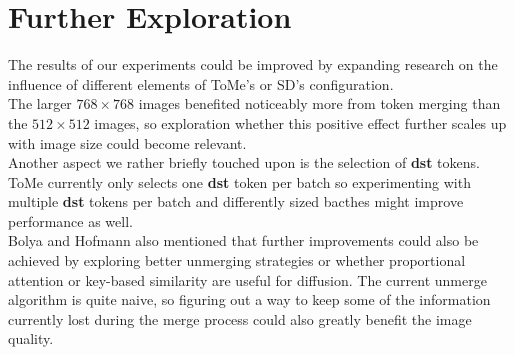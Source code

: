 \section{Further Exploration}
The results of our experiments could be improved by expanding research on the influence of different elements of ToMe's or SD's configuration.\\ 
The larger $768 \times 768$ images benefited noticeably more from token merging than the $512 \times 512$ images, so exploration whether this positive effect further scales up with image size could become relevant.\\
Another aspect we rather briefly touched upon is the selection of \textbf{dst} tokens. ToMe currently only selects one \textbf{dst} token per batch so experimenting with multiple \textbf{dst} tokens per batch and differently sized bacthes might improve performance as well.\\ 
Bolya and Hofmann also mentioned that further improvements could also be achieved by exploring better unmerging strategies or whether proportional attention or key-based similarity are useful for diffusion.
The current unmerge algorithm is quite naive, so figuring out a way to keep some of the information currently lost during the merge process could also greatly benefit the image quality.\\
